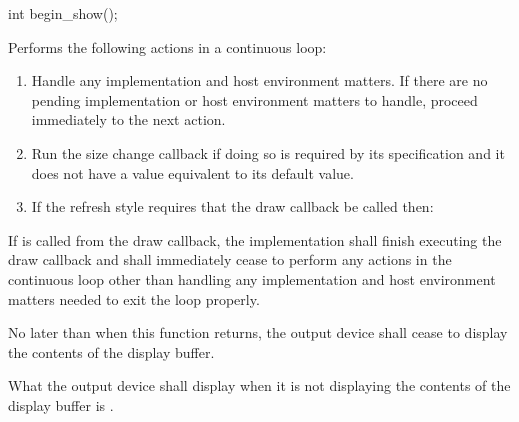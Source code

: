 %
\begin{itemdecl}
int begin_show();
\end{itemdecl}
\begin{itemdescr}
\pnum
\effects
Performs the following actions in a continuous loop:
\begin{enumerate}
\item Handle any implementation and host environment matters. If there are no pending implementation or host environment matters to handle, proceed immediately to the next action.
\item Run the size change callback if doing so is required by its specification and it does not have a value equivalent to its default value.
\item If the refresh style requires that the draw callback be called then:
\end{enumerate}

\pnum
If  is called from the draw callback, the implementation shall finish executing the draw callback and shall immediately cease to perform any actions in the continuous loop other than handling any implementation and host environment matters needed to exit the loop properly.

\pnum
No later than when this function returns, the output device shall cease to display the contents of the display buffer.

\pnum
What the output device shall display when it is not displaying the contents of the display buffer is \unspecnorm.


\end{itemdescr}
